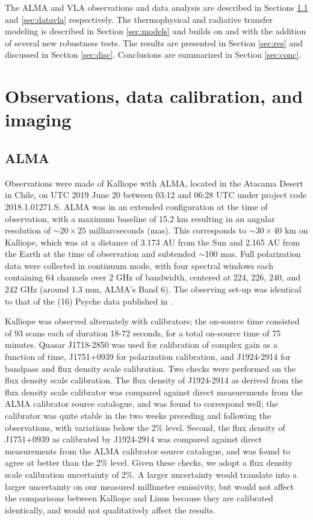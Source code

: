 \documentclass[]{aastex631}
\begin{document}
The ALMA and VLA observations and data analysis are described in Sections \ref{sec:dataalma} and \ref{sec:datavla} respectively. The thermophysical and radiative transfer modeling is described in Section \ref{sec:models} and builds on \cite{dekleer2021} and \cite{cambioni2022} with the addition of several new robustness tests. The results are presented in Section \ref{sec:res} and discussed in Section \ref{sec:disc}. Conclusions are summarized in Section \ref{sec:conc}.

\section{Observations, data calibration, and imaging}\label{sec:obs}

\subsection{ALMA}\label{sec:dataalma}

Observations were made of Kalliope with ALMA, located in the Atacama Desert in Chile, on UTC 2019 June 20 between 03:12 and 06:28 UTC under project code 2018.1.01271.S. ALMA was in an extended configuration at the time of observation, with a maximum baseline of 15.2 km resulting in an angular resolution of ${\sim}20{\times}25$ milliarcseconds (mas). This corresponds to ${\sim}30{\times}40$ km on Kalliope, which was at a distance of 3.173 AU from the Sun and 2.165 AU from the Earth at the time of observation and subtended $\sim$100 mas. Full polarization data were collected in continuum mode, with four spectral windows each containing 64 channels over 2 GHz of bandwidth, centered at 224, 226, 240, and 242 GHz (around 1.3 mm, ALMA's Band 6). The observing set-up was identical to that of the (16) Psyche data published in \cite{dekleer2021}.

Kalliope was observed alternately with calibrators; the on-source time consisted of 93 scans each of duration 18-72 seconds, for a total on-source time of 75 minutes. Quasar J1718-2850 was used for calibration of complex gain as a function of time, J1751+0939 for polarization calibration, and J1924-2914 for bandpass and flux density scale calibration. Two checks were performed on the flux density scale calibration. The flux density of J1924-2914 as derived from the flux density scale calibrator was compared against direct measurements from the ALMA calibrator source catalogue, and was found to correspond well; the calibrator was quite stable in the two weeks preceding and following the observations, with variations below the 2\% level. Second, the flux density of J1751+0939 as calibrated by J1924-2914 was compared against direct measurements from the ALMA calibrator source catalogue, and was found to agree at better than the 2\% level. Given these checks, we adopt a flux density scale calibration uncertainty of 2\%. A larger uncertainty would translate into a larger uncertainty on our measured millimeter emissivity, but would not affect the comparisons between Kalliope and Linus because they are calibrated identically, and would not qualitatively affect the results. 
\end{document}
